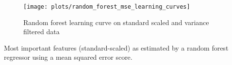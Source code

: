 \documentclass[a4paper,12pt]{article}
\begin{document}
\begin{figure}[h]
\centering
\texttt{[image: plots/random\_forest\_mse\_learning\_curves]}
\caption{Random forest learning curve on standard scaled and variance filtered data}
\end{figure}

\begin{table}
\centering
\resizebox{.6\width}{!}{}
\caption{Most important features (standard-scaled) as estimated by a random forest regressor using a mean squared error score.}
\end{table}
\end{document}
